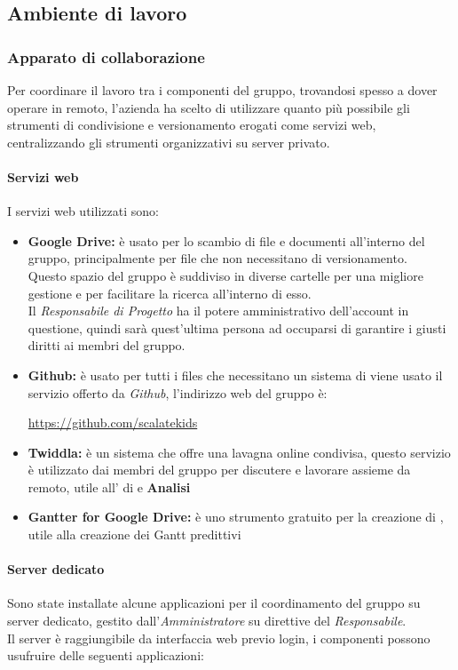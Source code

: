 \documentclass{scalatekids-article}
\begin{document}
\subsection{Ambiente di lavoro}
\subsubsection{Apparato di collaborazione}
Per coordinare il lavoro tra i componenti del gruppo, trovandosi spesso a dover
operare in remoto, l'azienda ha scelto di utilizzare quanto più possibile gli
strumenti di condivisione e versionamento erogati come servizi web,
centralizzando gli strumenti organizzativi su server privato.
\paragraph{Servizi web}
I servizi web utilizzati sono:
\begin{itemize}
\item\textbf{Google Drive:} è usato per lo scambio di file e documenti all'interno del gruppo, principalmente per file che non necessitano di versionamento.\\
  Questo spazio del gruppo è suddiviso in diverse cartelle per una migliore gestione e per facilitare la ricerca all'interno di esso.\\
  Il \textit{Responsabile di Progetto} ha il potere amministrativo dell'account in questione, quindi sarà quest'ultima persona ad occuparsi di garantire i giusti diritti ai membri del gruppo.
\item\textbf{Github:} è usato per tutti i files che necessitano un sistema di  viene usato il servizio offerto da \textit{Github}, l'indirizzo web del gruppo è:\\
  \begin{center}
    \url{https://github.com/scalatekids}
  \end{center}
\item\textbf{Twiddla:} è un sistema che offre una lavagna online condivisa, questo servizio è utilizzato dai membri del gruppo per discutere e lavorare assieme da remoto, utile all' di  e \textbf{Analisi}
\item\textbf{Gantter for Google Drive:} è uno strumento gratuito per la creazione di , utile alla creazione dei Gantt predittivi
\end{itemize}
\paragraph{Server dedicato}
\label{sec:server}
Sono state installate alcune applicazioni per il coordinamento del gruppo su
server dedicato, gestito dall'\textit{Amministratore} su direttive del
\textit{Responsabile}.\\ Il server è raggiungibile da interfaccia web previo
login, i componenti possono usufruire delle seguenti applicazioni:
\end{document}
